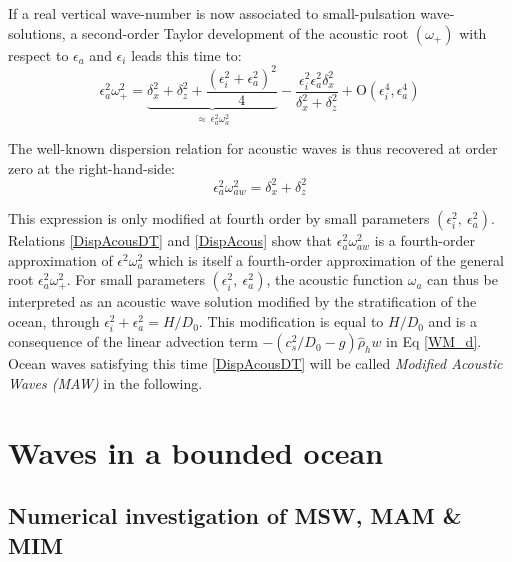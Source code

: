 \documentclass[a4paper,11pt]{article}
\begin{document}
If a real vertical wave-number is now associated to small-pulsation wave-solutions, a second-order Taylor development of the acoustic root $(\omega_+)$ with respect to $\epsilon_a$ and $\epsilon_i$ leads this time to:
\begin{equation}
		\epsilon_a^2\omega_+^2 =
		\underbrace{\delta_x^2+\delta_z^2
		+\frac{(\epsilon_i^2+\epsilon_a^2)^2}{4}}
		_{\approx\ \epsilon_a^2\omega_a^2}
		-\frac{\epsilon_i^2\epsilon_a^2\delta_x^2}{\delta_x^2+\delta_z^2}
		+\mathrm{O}(\epsilon_i^4,\epsilon_a^4)
		\label{DispAcousDT}
\end{equation}

The well-known dispersion relation for acoustic waves is thus recovered at order zero at the right-hand-side:
\begin{equation}
	\epsilon_a^2\omega_{aw}^2 =\delta_x^2+\delta_z^2
	\label{DispAcous}
\end{equation}

This expression is only modified at fourth order by small parameters $(\epsilon_i^2,\ \epsilon_a^2)$. Relations \ref{DispAcousDT} and \ref{DispAcous} show that $\epsilon_a^2 \omega_{aw}^2$ is a fourth-order approximation of $\epsilon^2 \omega_a^2$ which is itself a fourth-order approximation of the general root $\epsilon_a^2 \omega_+^2$.
For small parameters $(\epsilon_i^2,\ \epsilon_a^2)$, the acoustic function $\omega_a$ can thus be interpreted as an acoustic wave solution modified by the stratification of the ocean, through $\epsilon_i^2+\epsilon_a^2=H/D_0$. This modification is equal to $H/D_0$ and is a consequence of the linear advection term $-(c_s^2/D_0-g)\hat{\rho}_h w$ in Eq \ref{WM_d}. Ocean waves satisfying this time \ref{DispAcousDT} will be called \textit{Modified Acoustic Waves (MAW)} in the following.

\newpage
\section{Waves in a bounded ocean}
\label{SectionGraphic}

\subsection{Numerical investigation of MSW, MAM \& MIM}
\label{SubSectionPotBranches}
\end{document}
